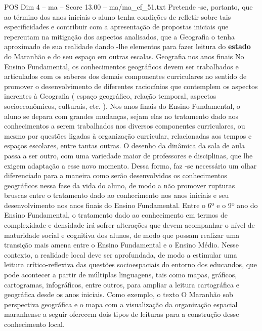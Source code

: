 \begin{textsample}{POS Dim 4 – ma – Score 13.00 – ma/ma\_ef\_51.txt}
Pretende -se, portanto, que ao término dos anos iniciais o aluno tenha condições de refletir sobre tais especificidades e contribuir com a apresentação de propostas iniciais que repercutam na mitigação dos aspectos analisados, que a Geografia o tenha aproximado de sua realidade dando -lhe elementos para fazer leitura do \textbf{estado} do Maranhão e do seu espaço em outras escalas.
Geografia nos anos finais No Ensino Fundamental, os conhecimentos geográficos devem ser trabalhados e articulados com os saberes dos demais componentes curriculares no sentido de promover o desenvolvimento de diferentes raciocínios que contemplem os aspectos inerentes à Geografia ( espaço geográfico, relação temporal, aspectos socioeconômicos, culturais, etc. ).
Nos anos finais do Ensino Fundamental, o aluno se depara com grandes mudanças, sejam elas no tratamento dado aos conhecimentos a serem trabalhados nos diversos componentes curriculares, ou mesmo por questões ligadas à organização curricular, relacionadas aos tempos e espaços escolares, entre tantas outras.
O desenho da dinâmica da sala de aula passa a ser outro, com uma variedade maior de professores e disciplinas, que lhe exigem adaptação a esse novo momento.
Dessa forma, faz -se necessário um olhar diferenciado para a maneira como serão desenvolvidos os conhecimentos geográficos nessa fase da vida do aluno, de modo a não promover rupturas bruscas entre o tratamento dado ao conhecimento nos anos iniciais e seu desenvolvimento nos anos finais do Ensino Fundamental.
Entre o 6º e o 9º ano do Ensino Fundamental, o tratamento dado ao conhecimento em termos de complexidade e densidade irá sofrer alterações que devem acompanhar o nível de maturidade social e cognitiva dos alunos, de modo que possam realizar uma transição mais amena entre o Ensino Fundamental e o Ensino Médio.
Nesse contexto, a realidade local deve ser aprofundada, de modo a estimular uma leitura crítico-reflexiva das questões socioespaciais do entorno dos educandos, que pode acontecer a partir de múltiplas linguagens, tais como mapas, gráficos, cartogramas, infográficos, entre outros, para ampliar a leitura cartográfica e geográfica desde os anos iniciais.
Como exemplo, o texto O Maranhão sob perspectiva geográfica e o mapa com a visualização da organização espacial maranhense a seguir oferecem dois tipos de leituras para a construção desse conhecimento local.

\end{textsample}
